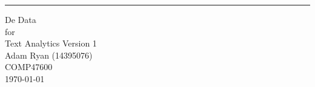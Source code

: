 \documentclass{scrreprt}
\date{}
\def\myversion{1 }
\begin{document}
	
	\begin{flushright}
		\rule{16cm}{5pt}\vskip1cm
		\begin{bfseries}
			\Huge{De Data\\}
			\vspace{1.9cm}
			for\\
			\vspace{1.9cm}
			Text Analytics
			\vspace{1.9cm}
			\LARGE{Version \myversion}\\
			\vspace{1.9cm}
			Adam Ryan (14395076)\\
			\vspace{1.9cm}
			COMP47600\\
			\vspace{1.9cm}
			\today\\
		\end{bfseries}
	\end{flushright}
	
\end{document}
